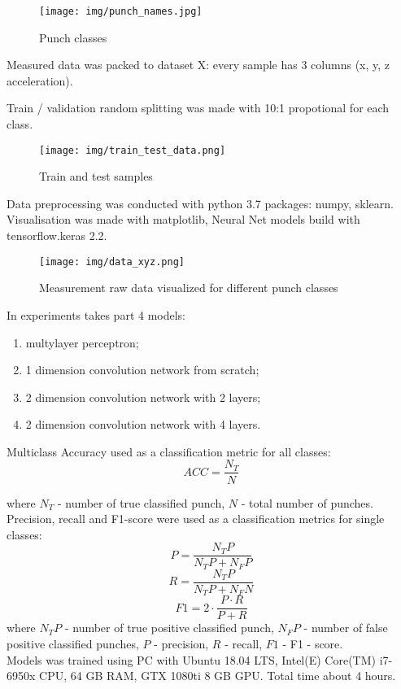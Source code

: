 \documentclass[sport,article,submit,moreauthors,pdftex]{Definitions/mdpi}
\begin{document}
\begin{figure}[H]
\texttt{[image: img/punch\_names.jpg]}
\caption{Punch classes}
\end{figure} 

Measured data was packed to dataset X: every sample has 3 columns (x, y, z acceleration).

Train / validation random splitting was made with 10:1 propotional for each class.

\begin{figure}[H]
\texttt{[image: img/train\_test\_data.png]}
\caption{Train and test samples}
\end{figure} 

 Data preprocessing was conducted with python 3.7 packages: numpy, sklearn. Visualisation was made with matplotlib, Neural Net models build with tensorflow.keras 2.2.  
 
\begin{figure}[H]
\texttt{[image: img/data\_xyz.png]}
\caption{Measurement raw data visualized for different punch classes}
\end{figure} 

In experiments takes part 4 models:
\begin{enumerate}
\item	multylayer perceptron; 
\item	1 dimension convolution network from scratch;
\item	2 dimension convolution network with 2 layers;
\item	2 dimension convolution network with 4 layers.
\end{enumerate}

Multiclass Accuracy used as a classification metric for all classes:
\begin{equation}
ACC = \frac{N_T}{N}
\end{equation}

where $N_T$ - number of true classified punch,  
$N$ - total number of punches.\\
Precision, recall and F1-score were used as a classification metrics for single classes:
\begin{equation}
P = \frac{N_TP}{N_TP + N_FP}
\end{equation}
\begin{equation}
R = \frac{N_TP}{N_TP + N_FN}
\end{equation}
\begin{equation}
F1 = 2 \cdot \frac{P \cdot R}{P + R}
\end{equation}
where $N_TP$ - number of true positive classified punch,  
$N_FP$ - number of false positive classified punches, $P$ - precision, $R$ - recall, $F1$ - F1 - score.\\
Models was trained using PC with Ubuntu 18.04 LTS, Intel(E) Core(TM) i7-6950x CPU, 64 GB RAM, GTX 1080ti 8 GB GPU. Total time about 4 hours.
\end{document}
